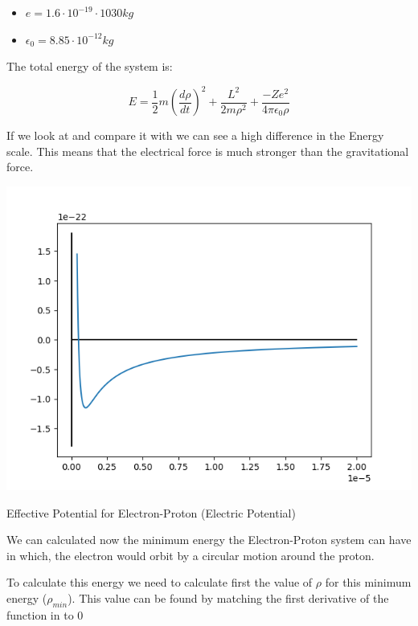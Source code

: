 \begin{itemize}
    \item $e = 1.6 \cdot 10^{-19} \cdot 10{30} kg$
    \item $\epsilon_0 = 8.85 \cdot 10^{-12} kg$
\end{itemize}

The total energy of the system is:

\begin{equation}
\label{energy_E-P_elec}
    E = \frac{1}{2}m\left(\frac{d\rho}{dt}\right)^2+\frac{L^2}{2m\rho^2}+ \frac{-Ze^2}{4\pi\epsilon_0\rho} 
\end{equation}

If we look at  and compare it with  we can see a high difference in the Energy scale. This means that the electrical force is much stronger than the gravitational force.

\begin{marginfigure}
    \includegraphics{images/E-P_elec_Potential_Well.png}
    \caption[Effective Potential for Electron-Proton (Electric Potential)]{Effective Potential for Electron-Proton (Electric Potential)}
\end{marginfigure}

We can calculated now the minimum energy the Electron-Proton system can have in which, the electron would orbit by a circular motion around the proton. 

To calculate this energy we need to calculate first the value of $\rho$ for this minimum energy ($\rho_{min}$). This value can be found by matching the first derivative of the function in  to 0

